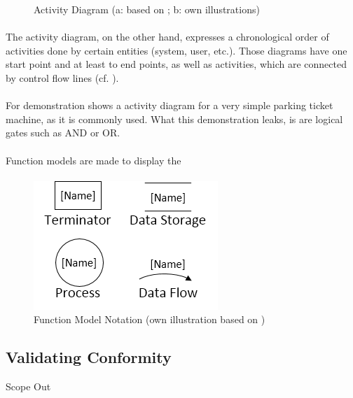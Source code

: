 \begin{figure}[H]
\begin{minipage}[m]{.5\linewidth}
        \label{fig:adEx}
    \end{minipage}
    \caption[Activity Diagram Notation and Example]{Activity Diagram (a: based on \cite[160]{Pohl.2007}; b: own illustrations)}\label{fig:adEx}
\end{figure}

\paragraph{} The activity diagram, on the other hand, expresses a chronological order of activities done by certain entities (system, user, etc.). Those diagrams have one start point and at least to end points, as well as activities, which are connected by control flow lines (cf. ).

\paragraph{} For demonstration  shows a activity diagram for a very simple parking ticket machine, as it is commonly used. What this demonstration leaks, is are logical gates such as AND or OR.


\paragraph{} Function models are made to display the 

\paragraph{} 
\begin{figure}[H]
    \centering
    \includegraphics[scale=0.9]{img/fmSymb.png}
    \caption[Function Model Notation]{Function Model Notation (own illustration based on \cite[190]{Pohl.2007})}
    \label{fig:fmSymb}
\end{figure}


\subsection{Validating Conformity}
Scope Out

